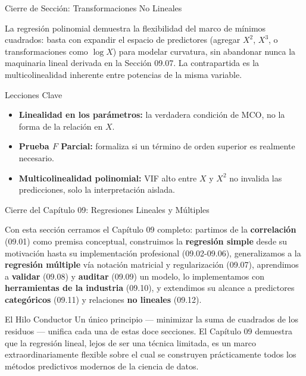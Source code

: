 \documentclass[10pt, aspectratio=169]{beamer}
\begin{document}
\begin{frame}{Cierre de Sección: Transformaciones No Lineales}
  \begin{reflexion}
    La regresión polinomial demuestra la flexibilidad del marco de mínimos cuadrados: basta con expandir el espacio de predictores (agregar $X^2$, $X^3$, o transformaciones como $\log X$) para modelar curvatura, sin abandonar nunca la maquinaria lineal derivada en la Sección 09.07. La contrapartida es la multicolinealidad inherente entre potencias de la misma variable.
  \end{reflexion}

  \vspace{0.2cm}
  \pause
  \begin{block}{Lecciones Clave}
    \begin{itemize}\itemsep=0.08cm
      \item \textbf{Linealidad en los parámetros:} la verdadera condición de MCO, no la forma de la relación en $X$.
      \item \textbf{Prueba $F$ Parcial:} formaliza si un término de orden superior es realmente necesario.
      \item \textbf{Multicolinealidad polinomial:} VIF alto entre $X$ y $X^2$ no invalida las predicciones, solo la interpretación aislada.
    \end{itemize}
  \end{block}
\end{frame}

\begin{frame}{Cierre del Capítulo 09: Regresiones Lineales y Múltiples}
  \scriptsize
  \begin{retoclase}
    Con esta sección cerramos el Capítulo 09 completo: partimos de la \textbf{correlación} (09.01) como premisa conceptual, construimos la \textbf{regresión simple} desde su motivación hasta su implementación profesional (09.02-09.06), generalizamos a la \textbf{regresión múltiple} vía notación matricial y regularización (09.07), aprendimos a \textbf{validar} (09.08) y \textbf{auditar} (09.09) un modelo, lo implementamos con \textbf{herramientas de la industria} (09.10), y extendimos su alcance a predictores \textbf{categóricos} (09.11) y relaciones \textbf{no lineales} (09.12).
  \end{retoclase}

  \vspace{0.08cm}
  \pause
  \begin{alertblock}{El Hilo Conductor}
    Un único principio --- minimizar la suma de cuadrados de los residuos --- unifica cada una de estas doce secciones. El Capítulo 09 demuestra que la regresión lineal, lejos de ser una técnica limitada, es un marco extraordinariamente flexible sobre el cual se construyen prácticamente todos los métodos predictivos modernos de la ciencia de datos.
  \end{alertblock}
\end{frame}
\end{document}
